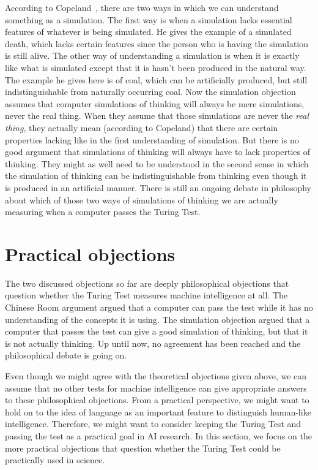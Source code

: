 According to Copeland~\cite{copeland2015artificial}, there are two ways in which we can understand something as a simulation. The first way is when a simulation lacks essential features of whatever is being simulated. He gives the example of a simulated death, which lacks certain features since the person who is having the simulation is still alive. The other way of understanding a simulation is when it is exactly like what is simulated except that it is hasn't been produced in the natural way. The example he gives here is of coal, which can be artificially produced, but still indistinguishable from naturally occurring coal.
Now the simulation objection assumes that computer simulations of thinking will always be mere simulations, never the real thing. When they assume that those simulations are never the \textit{real thing}, they actually mean (according to Copeland) that there are certain properties lacking like in the first understanding of simulation. But there is no good argument that simulations of thinking will always have to lack properties of thinking. They might as well need to be understood in the second sense in which the simulation of thinking can be indistinguishable from thinking even though it is produced in an artificial manner. There is still an ongoing debate in philosophy about which of those two ways of simulations of thinking we are actually measuring when a computer passes the Turing Test.


\section{Practical objections}
The two discussed objections so far are deeply philosophical objections that question whether the Turing Test measures machine intelligence at all. The Chinese Room argument argued that a computer can pass the test while it has no understanding of the concepts it is using. The simulation objection argued that a computer that passes the test can give a good simulation of thinking, but that it is not actually thinking. Up until now, no agreement has been reached and the philosophical debate is going on.

Even though we might agree with the theoretical objections given above, we can assume that no other tests for machine intelligence can give appropriate answers to these philosophical objections. From a practical perspective, we might want to hold on to the idea of language as an important feature to distinguish human-like intelligence. Therefore, we might want to consider keeping the Turing Test and passing the test as a practical goal in AI research. In this section, we focus on the more practical objections that question whether the Turing Test could be practically used in science.

